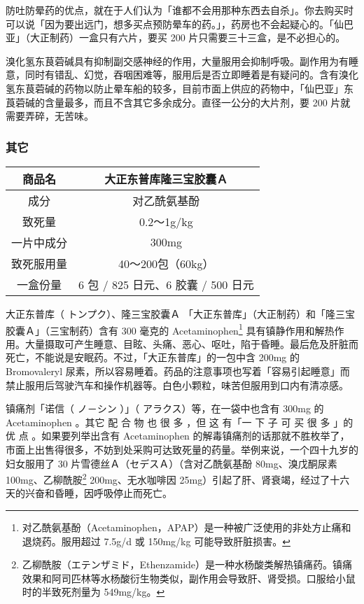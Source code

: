 \documentclass[UTF8]{ctexart}
\begin{document}
防吐防晕药的优点，就在于人们认为「谁都不会用那种东西去自杀」。你去购买时可以说「因为要出远门，想多买点预防晕车的药。」，药房也不会起疑心的。「仙巴亚」（大正制药）一盒只有六片，要买 200 片只需要三十三盒，是不必担心的。

溴化氢东茛菪碱具有抑制副交感神经的作用，大量服用会抑制呼吸。副作用为有睡意，同时有错乱、幻觉，吞咽困难等，服用后是否立即睡着是有疑问的。含有溴化氢东茛菪碱的药物以防止晕车船的较多，目前市面上供应的药物中，「仙巴亚」东莨菪碱的含量最多，而且不含其它多余成分。直径一公分的大片剂，要 200 片就需要弄碎，无苦味。


\subsubsection*{其它}

\begin{table}[htbp]
\begin{center}
\begin{tabular}{cc}

\toprule
商品名 & 大正东普库隆三宝胶囊Ａ \\
\midrule
成分 & 对乙酰氨基酚 \\
致死量 & 0.2～1g/kg\\
一片中成分 & 300mg \\
致死服用量 & 40～200包（60kg） \\
一盒份量 & 6 包 / 825 日元、6 胶囊 / 500 日元 \\
\bottomrule
\end{tabular}
\end{center}
\end{table}


大正东普库（ トンプク）、隆三宝胶囊Ａ 「大正东普库」（大正制药）和「隆三宝胶囊Ａ」（三宝制药）含有 300 毫克的 Acetaminophen\footnote{对乙酰氨基酚（Acetaminophen，APAP）是一种被广泛使用的非处方止痛和退烧药。服用超过 7.5g/d 或 150mg/kg 可能导致肝脏损害。} 具有镇静作用和解热作用。大量摄取可产生睡意、目眩、头痛、恶心、呕吐，陷于昏睡。最后危及肝脏而死亡，不能说是安眠药。不过，「大正东普库」的一包中含 200mg 的 Bromovaleryl 尿素，所以容易睡着。药品的注意事项也写着「容易引起睡意」而禁止服用后驾驶汽车和操作机器等。白色小颗粒，味苦但服用到口内有清凉感。

镇痛剂「诺信（ ノ－シン ）」（ アラクス）等，在一袋中也含有 300mg 的 Acetaminophen 。其它 配 合 物 也 很 多 ，但 这 有「一 下 子 可 买 很 多 」的优 点 。如果要列举出含有 Acetaminophen 的解毒镇痛剂的话那就不胜枚举了，市面上出售得很多，不妨到处采购可达致死量的药量。举例来说，一个四十九岁的妇女服用了 30 片雪德丝Ａ（セデスＡ）（含对乙酰氨基酚 80mg、溴戊酮尿素 100mg、乙柳酰胺\footnote{乙柳酰胺（エテンザミド，Ethenzamide）是一种水杨酸类解热镇痛药。镇痛效果和阿司匹林等水杨酸衍生物类似，副作用会导致肝、肾受损。口服给小鼠时的半致死剂量为 549mg/kg。} 200mg、无水咖啡因 25mg）引起了肝、肾衰竭，经过了十六天的兴奋和昏睡，因呼吸停止而死亡。
\end{document}
